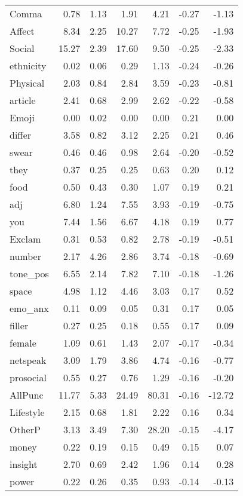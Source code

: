 \begin{longtable}{@{}p{3.4cm}rrrrrr@{}}
Comma & 0.78 & 1.13 & 1.91 & 4.21 & -0.27 & -1.13 \\
Affect & 8.34 & 2.25 & 10.27 & 7.72 & -0.25 & -1.93 \\
Social & 15.27 & 2.39 & 17.60 & 9.50 & -0.25 & -2.33 \\
ethnicity & 0.02 & 0.06 & 0.29 & 1.13 & -0.24 & -0.26 \\
Physical & 2.03 & 0.84 & 2.84 & 3.59 & -0.23 & -0.81 \\
article & 2.41 & 0.68 & 2.99 & 2.62 & -0.22 & -0.58 \\
Emoji & 0.00 & 0.02 & 0.00 & 0.00 & 0.21 & 0.00 \\
differ & 3.58 & 0.82 & 3.12 & 2.25 & 0.21 & 0.46 \\
swear & 0.46 & 0.46 & 0.98 & 2.64 & -0.20 & -0.52 \\
they & 0.37 & 0.25 & 0.25 & 0.63 & 0.20 & 0.12 \\
food & 0.50 & 0.43 & 0.30 & 1.07 & 0.19 & 0.21 \\
adj & 6.80 & 1.24 & 7.55 & 3.93 & -0.19 & -0.75 \\
you & 7.44 & 1.56 & 6.67 & 4.18 & 0.19 & 0.77 \\
Exclam & 0.31 & 0.53 & 0.82 & 2.78 & -0.19 & -0.51 \\
number & 2.17 & 4.26 & 2.86 & 3.74 & -0.18 & -0.69 \\
tone\_pos & 6.55 & 2.14 & 7.82 & 7.10 & -0.18 & -1.26 \\
space & 4.98 & 1.12 & 4.46 & 3.03 & 0.17 & 0.52 \\
emo\_anx & 0.11 & 0.09 & 0.05 & 0.31 & 0.17 & 0.05 \\
filler & 0.27 & 0.25 & 0.18 & 0.55 & 0.17 & 0.09 \\
female & 1.09 & 0.61 & 1.43 & 2.07 & -0.17 & -0.34 \\
netspeak & 3.09 & 1.79 & 3.86 & 4.74 & -0.16 & -0.77 \\
prosocial & 0.55 & 0.27 & 0.76 & 1.29 & -0.16 & -0.20 \\
AllPunc & 11.77 & 5.33 & 24.49 & 80.31 & -0.16 & -12.72 \\
Lifestyle & 2.15 & 0.68 & 1.81 & 2.22 & 0.16 & 0.34 \\
OtherP & 3.13 & 3.49 & 7.30 & 28.20 & -0.15 & -4.17 \\
money & 0.22 & 0.19 & 0.15 & 0.49 & 0.15 & 0.07 \\
insight & 2.70 & 0.69 & 2.42 & 1.96 & 0.14 & 0.28 \\
power & 0.22 & 0.26 & 0.35 & 0.93 & -0.14 & -0.13 \\

\end{longtable}
